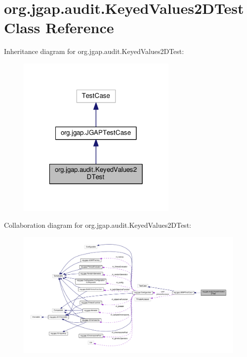 \hypertarget{classorg_1_1jgap_1_1audit_1_1_keyed_values2_d_test}{\section{org.\-jgap.\-audit.\-Keyed\-Values2\-D\-Test Class Reference}
\label{classorg_1_1jgap_1_1audit_1_1_keyed_values2_d_test}
}


Inheritance diagram for org.\-jgap.\-audit.\-Keyed\-Values2\-D\-Test\-:
\nopagebreak
\begin{figure}[H]
\begin{center}
\leavevmode
\includegraphics[width=220pt]{classorg_1_1jgap_1_1audit_1_1_keyed_values2_d_test__inherit__graph}
\end{center}
\end{figure}


Collaboration diagram for org.\-jgap.\-audit.\-Keyed\-Values2\-D\-Test\-:
\nopagebreak
\begin{figure}[H]
\begin{center}
\leavevmode
\includegraphics[width=350pt]{classorg_1_1jgap_1_1audit_1_1_keyed_values2_d_test__coll__graph}
\end{center}
\end{figure}
